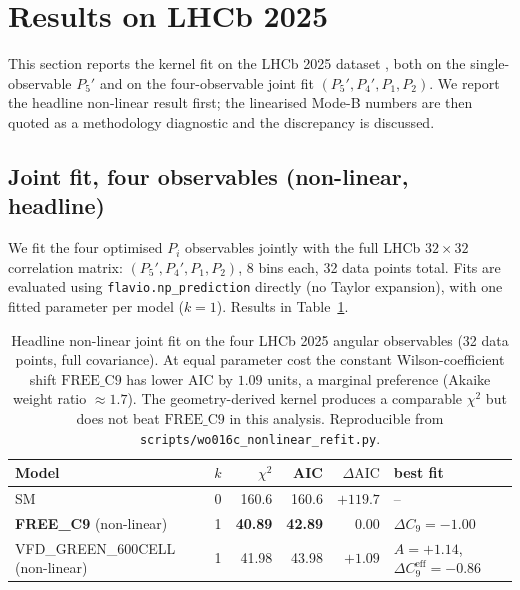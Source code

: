 \section{Results on LHCb 2025}\label{sec:results}

This section reports the kernel fit on the LHCb 2025 dataset
\citep{LHCb2025BKstmumuComp,LHCb2025BKstmumuHEPData}, both on the
single-observable $P_{5}'$ and on the four-observable joint fit
$(P_{5}', P_{4}', P_{1}, P_{2})$. We report the headline non-linear
result first; the linearised Mode-B numbers are then quoted as a
methodology diagnostic and the discrepancy is discussed.

\subsection{Joint fit, four observables (non-linear, headline)}\label{subsec:joint_fit}

We fit the four optimised $P_{i}$ observables jointly with the full
LHCb $32{\times}32$ correlation matrix:
$(P_{5}', P_{4}', P_{1}, P_{2})$, 8 bins each, 32 data points total.
Fits are evaluated using \texttt{flavio.np\_prediction} directly
(no Taylor expansion), with one fitted parameter per model
($k=1$). Results in Table~\ref{tab:joint_fit_nl}.

\begin{table}[h]
\centering
\small
\setlength{\tabcolsep}{4pt}
\begin{tabular}{lcrrrl}
\toprule
Model & $k$ & $\chi^{2}$ & AIC & $\Delta\mathrm{AIC}$ & best fit \\
\midrule
SM                              & 0 & 160.6 & 160.6 & $+119.7$ & -- \\
\textbf{FREE\_C9} (non-linear)  & 1 &  \textbf{40.89} &  \textbf{42.89} & $\boldsymbol{0.00}$ & $\Delta C_{9}=-1.00$ \\
VFD\_GREEN\_600CELL (non-linear)& 1 &  41.98 &  43.98 & $+1.09$ & $A=+1.14$, $\Delta C_{9}^{\mathrm{eff}}=-0.86$ \\
\bottomrule
\end{tabular}
\caption{Headline non-linear joint fit on the four LHCb 2025 angular
observables (32 data points, full covariance). At equal parameter cost
the constant Wilson-coefficient shift $\mathrm{FREE\_C9}$ has lower
AIC by $1.09$ units, a marginal preference (Akaike weight ratio
$\approx 1.7$). The geometry-derived kernel produces a comparable
$\chi^{2}$ but does not beat $\mathrm{FREE\_C9}$ in this analysis.
Reproducible from \texttt{scripts/wo016c\_nonlinear\_refit.py}.}
\label{tab:joint_fit_nl}
\end{table}


